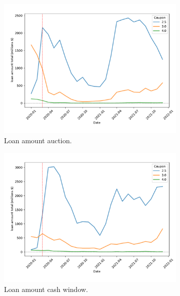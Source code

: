 \documentclass[11pt,a4paper]{article}
\begin{document}
\begin{figure}[h]
  \centering
     \begin{subfigure}[b]{0.49\textwidth}
      \includegraphics[width=0.998\textwidth]{../results/figures/LoanAmount_sum_mat30_loan1_timeseries_cpmonthly_2.5_4_auction.pdf}
      \caption{Loan amount auction.}
     \end{subfigure}
      \begin{subfigure}[b]{0.49\textwidth}
        \includegraphics[width=0.998\textwidth]{../results/figures/LoanAmount_sum_mat30_loan1_timeseries_cpmonthly_2.5_4_cash_window.pdf}
        \caption{Loan amount cash window.}
        \end{subfigure}
     \begin{subfigure}[b]{0.49\textwidth}

\end{subfigure}
\end{figure}
\end{document}
